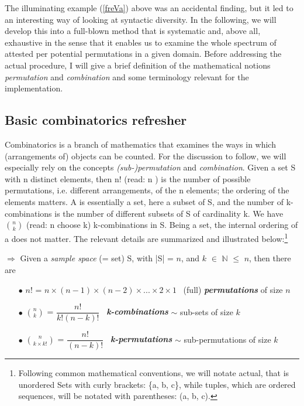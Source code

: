 \documentclass[output=paper,colorlinks,citecolor=brown,draft]{langscibook}
\begin{document}
The illuminating example (\ref{freVa}) above was an accidental finding, but it led to an interesting way of looking at syntactic diversity. In the following, we will develop this into a full-blown method that is systematic and, above all, exhaustive in the sense that it enables us to examine the whole spectrum of  attested per potential permutations in a given domain. Before addressing the actual procedure, I will give a brief definition of the  mathematical notions \textit{permutation} and  \textit{combination} and some terminology  relevant for the implementation.



\subsection{Basic combinatorics refresher}

Combinatorics is a branch of mathematics that examines the ways in which (arrangements of) objects can be counted. For the discussion to follow, we will especially rely on the concepts \textit{(sub-)permutation} and \textit{combination}. Given a set S with n distinct elements, then n! (read: n ) is the number of possible permutations, i.e. different arrangements, of the n elements; the ordering of the elements matters. A  is essentially a set, here a subset of S, and the number of k-combinations is the number of different subsets of S of cardinality k. We have  ${n}\choose{k}$ (read: n choose k) k-combinations in S. Being a set, the internal ordering of a  does not matter.   
The relevant details are summarized and illustrated below:\footnote{Following common mathematical conventions, we will notate actual, that is unordered Sets with curly brackets: \{a, b, c\}, while tuples, which are ordered sequences, will be notated with parentheses: (a, b, c).   }  

\largerpage

\noindent $\Rightarrow$ Given a \textit{sample space} (= set) S, with |S| = $n$, and  $k$ $\in$ $\mathbb{N}$  $\le$ $n$, then there are 
\begin{enumerate}
\item[$\bullet$] $n!$ { \color{gray} = $n \times (n-1) \times (n-2) \times ... \times 2 \times 1$ } \ (full)  \textit{\textbf{permutations}}     \hfill  {\color{gray}  of size $n$}
\item[$\bullet$]    ${n}\choose{k}$ =   {$\dfrac{ n! }{ k!(n-k)! } $} \ \textit{\textbf{k-combinations}}  \hfill  {\color{gray}$\sim$ sub-sets of size $k$}
\item[$\bullet$]    ${n}\choose{k}  \times k!$  {\color{gray} =  {\footnotesize$\dfrac{ n! }{ (n-k)! } $}} \ \textit{\textbf{k-permutations}}   \hfill {\color{gray}$\sim$ sub-permutations of size $k$}  \\ 
\end{enumerate}
\end{document}
